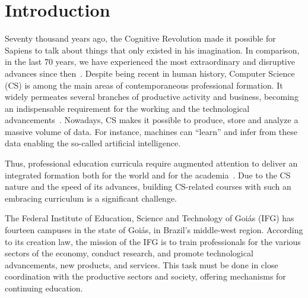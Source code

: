 \documentclass[sigconf, review]{educomp}
\begin{document}


\maketitle

\section{Introduction}\label{Introduction}
Seventy thousand years ago, the Cognitive Revolution made it possible for Sapiens to talk about things that only existed in his imagination. In comparison, in the last 70 years, we have experienced the most extraordinary and disruptive advances since then~\cite{harari2018sapiens}.
Despite being recent in human history, Computer Science (CS) is among the main areas of contemporaneous professional formation.
It widely permeates several branches of productive activity and business, becoming an indispensable requirement for the working and the technological advancements~\cite{fonseca2007historia}.
Nowadays, CS makes it possible to produce, store and analyze a massive volume of data.
For instance, machines can ``learn'' and infer from these data enabling the so-called artificial intelligence.

Thus, professional education curricula require augmented attention to deliver an integrated formation both for the world and for the academia~\cite{machado2010formaccao, moura2010relaccao, frigotto2005ensino, ciavatta2014ensino, de2016educaccao}.
Due to the CS nature and the speed of its advances, building CS-related courses with such an embracing curriculum is a significant challenge.

The Federal Institute of Education, Science and Technology of Goiás (IFG) has fourteen campuses in the state of Goiás, in Brazil's middle-west region.
According to its creation law, the mission of the IFG is to train professionals for the various sectors of the economy, conduct research, and promote technological advancements, new products, and services.
This task must be done in close coordination with the productive sectors and society, offering mechanisms for continuing education.
\end{document}
